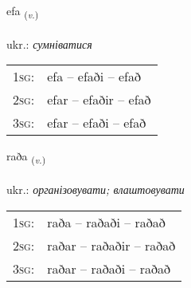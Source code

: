 \documentclass[frontgrid, backgrid]{flacards}\usepackage[]{graphicx}\usepackage[]{xcolor}
\begin{document}
\renewcommand{\flhead}{\vskip5pt \fboxsep=0pt {\small\bfseries\footnotesize Sagnorð | дієслово}}
\renewcommand{\fcfoot}{\vskip5pt \fboxsep=0pt \hspace{2pt}{\small\bfseries\footnotesize 2K}}

\renewcommand{\blhead}{\vskip5pt {\small\bfseries\footnotesize Sagnorð | дієслово }}
\renewcommand{\bcfoot}{\vskip5pt \hspace{2pt}{\small\bfseries\footnotesize 2K}}


{efa \small{\textsubscript{(\textit{v.})}} \\[1ex] %
\textphonetic{[ɛːva]} \\
ukr.: \emph{сумніватися} \\  [2ex]
\renewcommand*{\arraystretch}{0.8}
\begin{tabular}{p{1cm}l}
\textsc{1sg}: & efa -- efaði -- efað \\ 
\textsc{2sg}: & efar -- efaðir -- efað \\ 
\textsc{3sg}: & efar -- efaði -- efað \\ 
\end{tabular}
}

\renewcommand{\flhead}{\vskip5pt \fboxsep=0pt {\small\bfseries\footnotesize Sagnorð | дієслово}}
\renewcommand{\fcfoot}{\vskip5pt \fboxsep=0pt \hspace{2pt}{\small\bfseries\footnotesize 2K}}

\renewcommand{\blhead}{\vskip5pt {\small\bfseries\footnotesize Sagnorð | дієслово }}
\renewcommand{\bcfoot}{\vskip5pt \hspace{2pt}{\small\bfseries\footnotesize 2K}}


{raða \small{\textsubscript{(\textit{v.})}} \\[1ex] %
\textphonetic{[raːða]} \\
ukr.: \emph{організовувати; влаштовувати} \\  [2ex]
\renewcommand*{\arraystretch}{0.8}
\begin{tabular}{p{1cm}l}
\textsc{1sg}: & raða -- raðaði -- raðað \\ 
\textsc{2sg}: & raðar -- raðaðir -- raðað \\ 
\textsc{3sg}: & raðar -- raðaði -- raðað \\ 
\end{tabular}
}
\end{document}
